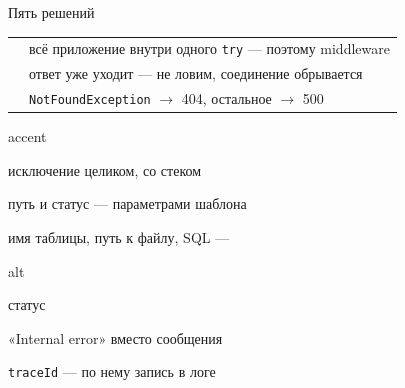 \documentclass[aspectratio=169,10pt,t]{beamer}
\begin{document}
\begin{frame}{Пять решений}
  \slidetop
  {\renewcommand{\arraystretch}{1.45}
  \begin{tabular}{@{}L{4.4cm}L{8.4cm}@{}}
        & всё приложение внутри одного
      \texttt{try} --- поэтому middleware  \\
     & ответ уже уходит --- не ловим,
      соединение обрывается \\
         & \texttt{NotFoundException} $\to$ 404,
      остальное $\to$ 500 \\
  \end{tabular}}

  \slidegap
  \begin{minipage}[t]{0.47\textwidth}
    \par\vspace{0.6em}
    \begin{cbul}{accent}
      \item исключение целиком, со стеком
      \item путь и статус --- параметрами шаблона
      \item имя таблицы, путь к файлу, SQL --- 
    \end{cbul}
  \end{minipage}\hfill
  \begin{minipage}[t]{0.47\textwidth}
    \par\vspace{0.6em}
    \begin{cbul}{alt}
      \item статус
      \item «Internal error» вместо сообщения
      \item \texttt{traceId} --- по нему запись в логе
    \end{cbul}
  \end{minipage}
\end{frame}
\end{document}
